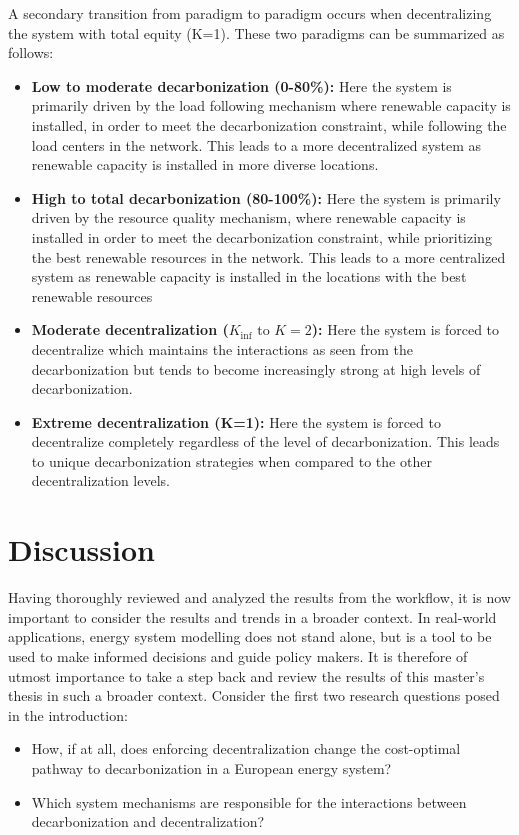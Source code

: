 \documentclass[preprint,12pt,nopreprintline]{elsarticle}
\begin{document}
\medskip
\noindent
A secondary transition from paradigm to paradigm occurs when decentralizing the system with total equity (K=1). These two paradigms can be summarized as follows:
\begin{itemize}
  \item \textbf{Low to moderate decarbonization (0-80\%):} Here the system is primarily driven by the load following mechanism where renewable capacity is installed, in order to meet the decarbonization constraint, while following the load centers in the network. This leads to a more decentralized system as renewable capacity is installed in more diverse locations.
  \item \textbf{High to total decarbonization (80-100\%):} Here the system is primarily driven by the resource quality mechanism, where renewable capacity is installed in order to meet the decarbonization constraint, while prioritizing the best renewable resources in the network. This leads to a more centralized system as renewable capacity is installed in the locations with the best renewable resources
  \item  \textbf{Moderate decentralization ($K_\text{inf} \text{ to } K=2$):} Here the system is forced to decentralize which maintains the interactions as seen from the decarbonization but tends to become increasingly strong at high levels of decarbonization.
  \item \textbf{Extreme decentralization (K=1):} Here the system is forced to decentralize completely regardless of the level of decarbonization. This leads to unique decarbonization strategies when compared to the other decentralization levels.
  \end{itemize}

\medskip
\noindent
\section{Discussion}
\noindent
Having thoroughly reviewed and analyzed the results from the workflow, it is now important to consider the results and trends in a broader context. In real-world applications, energy system modelling does not stand alone, but is a tool to be used to make informed decisions and guide policy makers.  It is therefore of utmost importance to take a step back and review the results of this master's thesis in such a broader context. Consider the first two research questions posed in the introduction:

\begin{itemize}
\item How, if at all, does enforcing decentralization change the cost-optimal pathway to decarbonization in a European energy system?
\item Which system mechanisms are responsible for the interactions between decarbonization and decentralization?
\end{itemize}
\end{document}
